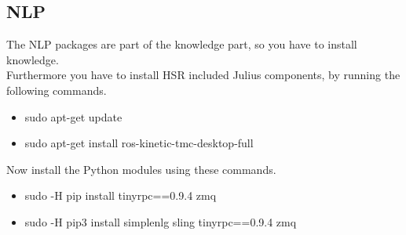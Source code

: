 \documentclass[main.tex]{subfiles}
\begin{document}
\subsection{NLP}
The NLP packages are part of the knowledge part, so you have to install knowledge.\\
Furthermore you have to install HSR included Julius components, by running the following commands.
\begin{itemize}
\item sudo apt-get update
\item sudo apt-get install ros-kinetic-tmc-desktop-full 
\end{itemize}
Now install the Python modules using these commands.
\begin{itemize}
\item sudo -H pip install tinyrpc==0.9.4 zmq
\item sudo -H pip3 install simplenlg sling tinyrpc==0.9.4 zmq 
\end{itemize}
	
\end{document}

